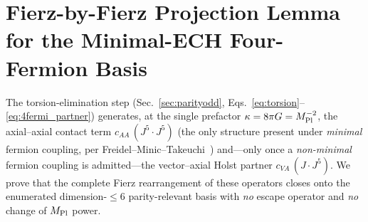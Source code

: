 \documentclass[aps,prd,twocolumn,superscriptaddress,showpacs,preprintnumbers,nofootinbib,longbibliography,floatfix]{revtex4-2}
\begin{document}
\section{Fierz-by-Fierz Projection Lemma for the Minimal-ECH
Four-Fermion Basis}\label{app:fierz}
The torsion-elimination step (Sec.~\ref{sec:parityodd},
Eqs.~\eqref{eq:torsion}--\eqref{eq:4fermi_partner}) generates, at the single
prefactor $\kappa=8\pi G=M_{\rm Pl}^{-2}$, the axial--axial contact term
$c_{AA}\,(J^5\!\cdot\!J^5)$ (the only structure present under \emph{minimal}
fermion coupling, per Freidel--Minic--Takeuchi~\cite{Freidel2005}) and---only
once a \emph{non-minimal} fermion coupling is admitted---the
vector--axial Holst partner $c_{VA}\,(J\!\cdot\!J^5)$. We prove that the
complete Fierz rearrangement of these operators closes onto the enumerated
dimension-$\le 6$ parity-relevant basis with \emph{no} escape operator and
\emph{no} change of $M_{\rm Pl}$ power.
\end{document}
